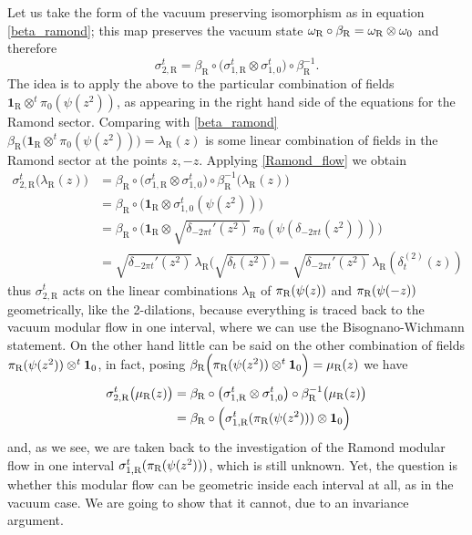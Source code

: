 Let us take the form of the vacuum preserving isomorphism 
as in equation \eqref{beta_ramond}; this map preserves 
the vacuum state $\omega_{\textrm{R}}\circ\beta_{\textrm{R}}=
\omega_{\textrm{R}}\otimes\omega_0$ and therefore 
\begin{equation}
\label{Ramond_flow}
\sigma_{2,\textrm{R}}^t=\beta_{\textrm{R}}\circ
\big(\sigma_{1,\textrm{R}}^t\otimes\sigma_{1,0}^t\big)
\circ\beta_{\textrm{R}}^{-1}.
\end{equation}
The idea is to apply the above to the particular 
combination of fields
$\bm{1}_{\textrm{R}}\otimes^t\pi_0(\psi(z^2))$, as 
appearing in the right hand side of the equations
for the Ramond sector.
Comparing with \eqref{beta_ramond} $\beta_{\textrm{R}}
\Big(\bm{1}_{\textrm{R}}\otimes^t\pi_0(\psi(z^2))\Big)=
\lambda_{\textrm{R}}(z)$ is some linear combination 
of fields in the Ramond sector at the points $z,-z$.
Applying \eqref{Ramond_flow} we obtain 
\begin{align*}
\sigma_{2,\textrm{R}}^t\big(\lambda_{\textrm{R}}(z)\big)
&=\beta_{\textrm{R}}\circ
\big(\sigma_{1,\textrm{R}}^t\otimes\sigma_{1,0}^t\big)
\circ\beta_{\textrm{R}}^{-1}\big(\lambda_{\textrm{R}}(z)\big)\\
&=\beta_{\textrm{R}}\circ\big(\bm{1}_{\textrm{R}}\otimes
\sigma_{1,0}^t(\psi(z^2))\big)\\
&=\beta_{\textrm{R}}\circ\big(\bm{1}_{\textrm{R}}\otimes
\sqrt{\delta_{-2\pi t}'(z^2)}\,
\pi_0(\psi(\delta_{-2\pi t}(z^2)))\big)\\
&=\sqrt{\delta_{-2\pi t}'(z^2)}\,
\lambda_{\textrm{R}}\Big(\sqrt{\delta_t(z^2)}\Big)=
\sqrt{\delta_{-2\pi t}'(z^2)}\,
\lambda_{\textrm{R}}(\delta_t^{(2)}(z))
\end{align*}
thus $\sigma_{2,\textrm{R}}^t$ acts on the linear 
combinations $\lambda_{\textrm{R}}$ of $\pi_{\textrm{R}}(\psi(z))$ and
$\pi_{\textrm{R}}(\psi(-z))$ geometrically, like the 2-dilations, because 
everything is traced back to the vacuum modular flow 
in one interval, where we can use the Bisognano-Wichmann
statement. On the other hand little can be said on the 
other combination of fields $\pi_{\textrm{R}}(\psi(z^2))\otimes^t\bm{1}_0$,
in fact, posing $\beta_{\textrm{R}}
\Big(\pi_{\textrm{R}}(\psi(z^2))\otimes^t\bm{1}_0\Big)=\mu_{\textrm{R}}(z)$
we have 
\begin{align*}
\sigma_{2,\textrm{R}}^t\big(\mu_{\textrm{R}}(z)\big)
&=\beta_{\textrm{R}}\circ
\big(\sigma_{1,\textrm{R}}^t\otimes\sigma_{1,0}^t\big)
\circ\beta_{\textrm{R}}^{-1}\big(\mu_{\textrm{R}}(z)\big)\\
&=\beta_{\textrm{R}}\circ
\Big(\sigma_{1,\textrm{R}}^t(\pi_{\textrm{R}}(\psi(z^2)))\otimes\bm{1}_0\Big)
\end{align*}
and, as we see, we are taken back to the investigation 
of the Ramond modular flow in one interval 
$\sigma_{1,\textrm{R}}^t(\pi_{\textrm{R}}(\psi(z^2)))$, which is still 
unknown. Yet, the question is whether this modular flow
can be geometric inside each interval at all, as in the vacuum 
case. We are going to show that it cannot, due to an invariance 
argument. 

